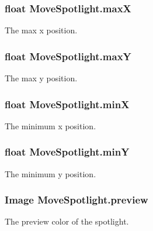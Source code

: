 \subsubsection[{maxX}]{\setlength{\rightskip}{0pt plus 5cm}float Move\+Spotlight.\+maxX}\label{class_move_spotlight_affbf3080d9cf95a56d80f1b30b4ee415}


The max x position. 

\subsubsection[{maxY}]{\setlength{\rightskip}{0pt plus 5cm}float Move\+Spotlight.\+maxY}\label{class_move_spotlight_a255c1781f89cb8048d3346d8ed17ee24}


The max y position. 

\subsubsection[{minX}]{\setlength{\rightskip}{0pt plus 5cm}float Move\+Spotlight.\+minX}\label{class_move_spotlight_ab6bdcf35eef7c30ed2f43fe359636c06}


The minimum x position. 

\subsubsection[{minY}]{\setlength{\rightskip}{0pt plus 5cm}float Move\+Spotlight.\+minY}\label{class_move_spotlight_a791cb5fd988708314ded26cddd7381de}


The minimum y position. 

\subsubsection[{preview}]{\setlength{\rightskip}{0pt plus 5cm}Image Move\+Spotlight.\+preview}\label{class_move_spotlight_a4663676f87804903d44b90cfad77909e}


The preview color of the spotlight. 

